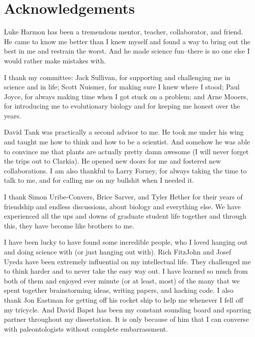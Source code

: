\chapter*{Acknowledgements}

Luke Harmon has been a tremendous mentor, teacher, collaborator, and friend. He came to know me better than I knew myself and found a way to bring out the best in me and restrain the worst. And he made science fun--there is no one else I would rather make mistakes with. 

I thank my committee: Jack Sullivan, for supporting and challenging me in science and in life; Scott Nuismer, for making sure I knew where I stood; Paul Joyce, for always making time when I got stuck on a problem; and Arne Mooers, for introducing me to evolutionary biology and for keeping me honest over the years.

David Tank was practically a second advisor to me. He took me under his wing and taught me how to think and how to be a scientist. And somehow he was able to convince me that plants are actually pretty damn awesome (I will never forget the trips out to Clarkia). He opened new doors for me and fostered new collaborations. I am also thankful to Larry Forney, for always taking the time to talk to me, and for calling me on my bullshit when I needed it.

I thank Simon Uribe-Convers, Brice Sarver, and Tyler Hether for their years of friendship and endless discussions, about biology and everything else. We have experienced all the ups and downs of graduate student life together and through this, they have become like brothers to me.

I have been lucky to have found some incredible people, who I loved hanging out and doing science with (or just hanging out with). Rich FitzJohn and Josef Uyeda have been extremely influential on my intellectual life. They challenged me to think harder and to never take the easy way out. I have learned so much from both of them and enjoyed ever minute (or at least, most) of the many that we spent together brainstorming ideas, writing papers, and hacking code. I also thank Jon Eastman for getting off his rocket ship to help me whenever I fell off my tricycle. And David Bapst has been my constant sounding board and sparring partner throughout my dissertation. It is only because of him that I can converse with paleontologists without complete embarrassment.

